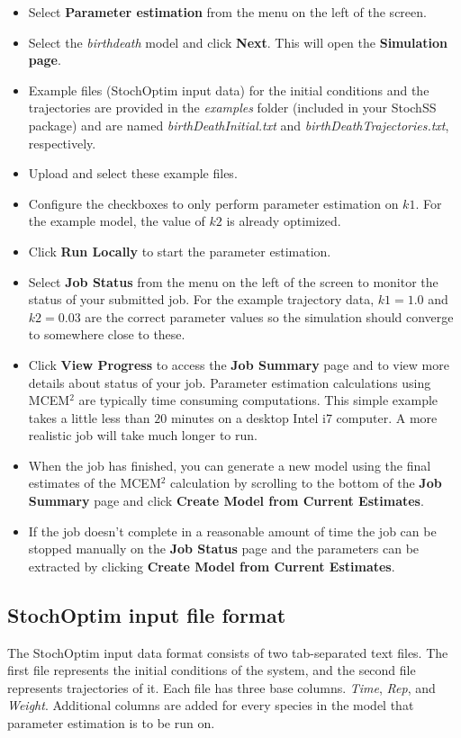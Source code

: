 \begin{itemize}
\item Select \textbf{Parameter estimation} from the menu on the left of the screen.
\item Select the \textit{birthdeath} model and click \textbf{Next}. This will open the \textbf{Simulation page}.
\item Example files (StochOptim input data) for the initial conditions and the trajectories are provided in the \textit{examples} folder (included in your StochSS package) and are named \textit{birthDeathInitial.txt} and \textit{birthDeathTrajectories.txt}, respectively.
\item Upload and select these example files.
\item Configure the checkboxes to only perform parameter estimation on $k1$. For the example model, the value of $k2$ is already optimized.
\item Click \textbf{Run Locally} to start the parameter estimation.
\item Select \textbf{Job Status} from the menu on the left of the screen to monitor the status of your submitted job. For the example trajectory data, $k1 = 1.0$ and $k2 = 0.03$ are the correct parameter values so the simulation should converge to somewhere close to these.
\item Click \textbf{View Progress} to access the \textbf{Job Summary} page and to view more details about status of your job. Parameter estimation calculations using MCEM$^2$ are typically time consuming computations. This simple example takes a little less than $20$ minutes on a desktop Intel i7 computer. A more realistic job will take much longer to run.
\item When the job has finished, you can generate a new model using the final estimates of the MCEM$^2$ calculation by scrolling to the bottom of the \textbf{Job Summary} page and click \textbf{Create Model from Current Estimates}.
\item If the job doesn't complete in a reasonable amount of time the job can be stopped manually on the \textbf{Job Status} page and the parameters can be extracted by clicking \textbf{Create Model from Current Estimates}.
\end{itemize}

\subsection{StochOptim input file format}
The StochOptim input data format consists of two tab-separated text files.
The first file represents the initial conditions of the system, and the second file represents trajectories of it.
Each file has three base columns. \textit{Time}, \textit{Rep}, and \textit{Weight}. Additional columns are added for every species in the model that parameter estimation is to be run on.

